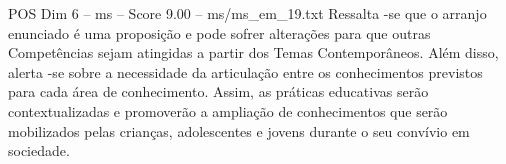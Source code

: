 \begin{textsample}{POS Dim 6 – ms – Score 9.00 – ms/ms\_em\_19.txt}
Ressalta -se que o arranjo enunciado é uma proposição e pode sofrer alterações para que outras Competências sejam atingidas a partir dos Temas Contemporâneos.
Além disso, alerta -se sobre a necessidade da articulação entre os conhecimentos previstos para cada área de conhecimento.
Assim, as práticas educativas serão contextualizadas e promoverão a ampliação de conhecimentos que serão mobilizados pelas crianças, adolescentes e jovens durante o seu convívio em sociedade.

\end{textsample}
